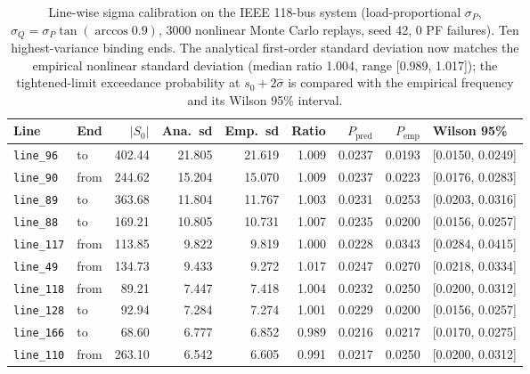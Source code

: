 \begin{table}[t]
\centering
\caption{Line-wise sigma calibration on the IEEE 118-bus system
(load-proportional $\sigma_P$, $\sigma_Q=\sigma_P\tan(\arccos 0.9)$,
3000 nonlinear Monte Carlo replays, seed 42, 0 PF failures).
Ten highest-variance binding ends.  The analytical first-order standard
deviation now matches the empirical nonlinear standard deviation
(median ratio 1.004, range [0.989, 1.017]);
the tightened-limit exceedance probability at $s_0+2\hat\sigma$ is compared
with the empirical frequency and its Wilson 95\% interval.
\label{tab:sigma-calibration}}
\scriptsize
\begin{tabularx}{\textwidth}{@{}Xlrrrrrrl@{}}
\toprule
Line & End & $|S_0|$ & Ana.\ sd & Emp.\ sd & Ratio & $P_{\mathrm{pred}}$ & $P_{\mathrm{emp}}$ & Wilson 95\% \\
\midrule
\texttt{line\_96} & to & 402.44 & 21.805 & 21.619 & 1.009 & 0.0237 & 0.0193 & [0.0150, 0.0249] \\
\texttt{line\_90} & from & 244.62 & 15.204 & 15.070 & 1.009 & 0.0237 & 0.0223 & [0.0176, 0.0283] \\
\texttt{line\_89} & to & 363.68 & 11.804 & 11.767 & 1.003 & 0.0231 & 0.0253 & [0.0203, 0.0316] \\
\texttt{line\_88} & to & 169.21 & 10.805 & 10.731 & 1.007 & 0.0235 & 0.0200 & [0.0156, 0.0257] \\
\texttt{line\_117} & from & 113.85 & 9.822 & 9.819 & 1.000 & 0.0228 & 0.0343 & [0.0284, 0.0415] \\
\texttt{line\_49} & from & 134.73 & 9.433 & 9.272 & 1.017 & 0.0247 & 0.0270 & [0.0218, 0.0334] \\
\texttt{line\_118} & from & 89.21 & 7.447 & 7.418 & 1.004 & 0.0232 & 0.0250 & [0.0200, 0.0312] \\
\texttt{line\_128} & to & 92.94 & 7.284 & 7.274 & 1.001 & 0.0229 & 0.0200 & [0.0156, 0.0257] \\
\texttt{line\_166} & to & 68.60 & 6.777 & 6.852 & 0.989 & 0.0216 & 0.0217 & [0.0170, 0.0275] \\
\texttt{line\_110} & from & 263.10 & 6.542 & 6.605 & 0.991 & 0.0217 & 0.0250 & [0.0200, 0.0312] \\
\bottomrule
\end{tabularx}
\end{table}
